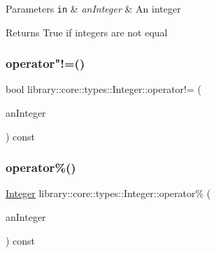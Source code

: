 \begin{DoxyParams}[1]{Parameters}
\mbox{\tt in}  & {\em an\+Integer} & An integer \\
\hline
\end{DoxyParams}
\begin{DoxyReturn}{Returns}
True if integers are not equal 
\end{DoxyReturn}
\mbox{\label{classlibrary_1_1core_1_1types_1_1_integer_a9c3c4e9564a3a8da5133207f3197d3a3}} 
\subsubsection{\texorpdfstring{operator"!=()}{operator!=()}\hspace{0.1cm}{\footnotesize\ttfamily [2/2]}}
{\footnotesize\ttfamily bool library\+::core\+::types\+::\+Integer\+::operator!= (\begin{DoxyParamCaption}\item[{const \hyperlink{classlibrary_1_1core_1_1types_1_1_integer_a623afb1580f870fd8a1997b1c12c917d}{Integer\+::\+Value\+Type} \&}]{an\+Integer }\end{DoxyParamCaption}) const}

\mbox{\label{classlibrary_1_1core_1_1types_1_1_integer_aaef6b38feb77d2d901cb75546690ff19}} 
\subsubsection{\texorpdfstring{operator\%()}{operator\%()}\hspace{0.1cm}{\footnotesize\ttfamily [1/2]}}
{\footnotesize\ttfamily \hyperlink{classlibrary_1_1core_1_1types_1_1_integer}{Integer} library\+::core\+::types\+::\+Integer\+::operator\% (\begin{DoxyParamCaption}\item[{const \hyperlink{classlibrary_1_1core_1_1types_1_1_integer}{Integer} \&}]{an\+Integer }\end{DoxyParamCaption}) const}

